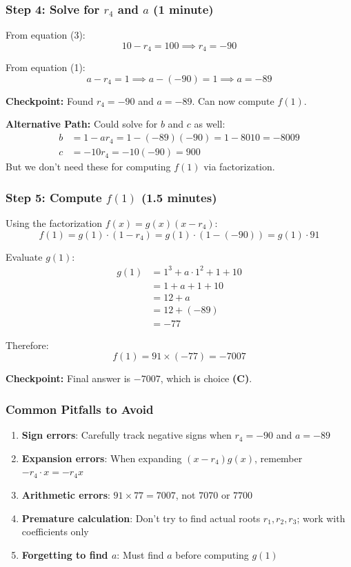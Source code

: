 \documentclass[]{article}
\begin{document}
\begin{solutionbox}
\subsubsection*{Step 4: Solve for $r_4$ and $a$ (1 minute)}

From equation (3):
\[10 - r_4 = 100 \implies r_4 = -90\]

From equation (1):
\[a - r_4 = 1 \implies a - (-90) = 1 \implies a = -89\]

\textbf{Checkpoint:} Found $r_4 = -90$ and $a = -89$. Can now compute $f(1)$.

\textbf{Alternative Path:} Could solve for $b$ and $c$ as well:
\begin{align*}
b &= 1 - ar_4 = 1 - (-89)(-90) = 1 - 8010 = -8009 \\
c &= -10r_4 = -10(-90) = 900
\end{align*}
But we don't need these for computing $f(1)$ via factorization.

\subsubsection*{Step 5: Compute $f(1)$ (1.5 minutes)}

Using the factorization $f(x) = g(x)(x - r_4)$:
\[f(1) = g(1) \cdot (1 - r_4) = g(1) \cdot (1 - (-90)) = g(1) \cdot 91\]

Evaluate $g(1)$:
\begin{align*}
g(1) &= 1^3 + a \cdot 1^2 + 1 + 10 \\
&= 1 + a + 1 + 10 \\
&= 12 + a \\
&= 12 + (-89) \\
&= -77
\end{align*}

Therefore:
\[f(1) = 91 \times (-77) = -7007\]

\textbf{Checkpoint:} Final answer is $\boxed{-7007}$, which is choice \textbf{(C)}.

\subsubsection*{Common Pitfalls to Avoid}

\begin{enumerate}[leftmargin=*]
    \item \textbf{Sign errors}: Carefully track negative signs when $r_4 = -90$ and $a = -89$
    \item \textbf{Expansion errors}: When expanding $(x-r_4)g(x)$, remember $-r_4 \cdot x = -r_4x$
    \item \textbf{Arithmetic errors}: $91 \times 77 = 7007$, not $7070$ or $7700$
    \item \textbf{Premature calculation}: Don't try to find actual roots $r_1, r_2, r_3$; work with coefficients only
    \item \textbf{Forgetting to find $a$}: Must find $a$ before computing $g(1)$
\end{enumerate}
\end{solutionbox}
\end{document}
